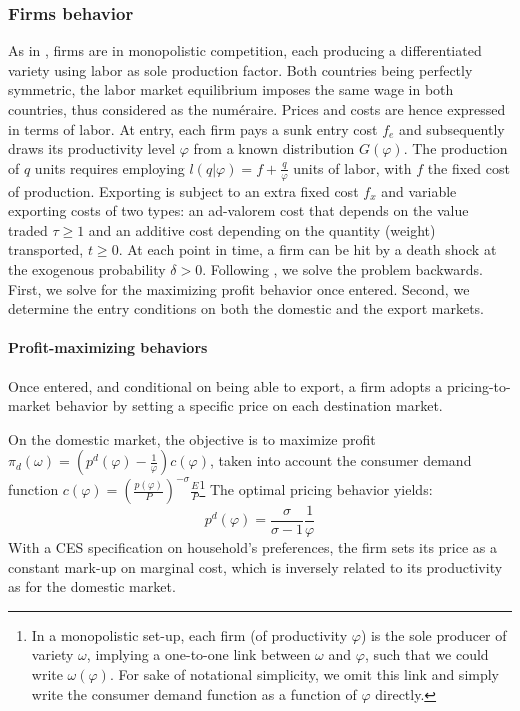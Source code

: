 \documentclass[a4paper,11pt]{article}
\begin{document}
\subsubsection{Firms behavior}

As in \cite{melitz}, firms are in monopolistic competition, each producing a differentiated variety using labor as sole production factor. Both countries being perfectly symmetric, the labor market equilibrium imposes the same wage in both countries, thus considered as the num\'{e}raire. Prices and costs are hence expressed in terms of labor. At entry, each firm pays a sunk entry cost $f_e$ and subsequently draws its productivity level $\varphi$ from a known distribution $G(\varphi)$. The production of $q$ units requires employing $l(q|\varphi) = f+\frac{q}{\varphi}$ units of labor, with $f$ the fixed cost of production. Exporting is subject to an extra fixed cost $f_x$ and variable exporting costs of two types: an ad-valorem cost that depends on the value traded $\tau\geq 1$ and an additive cost depending on the quantity (weight) transported, $t\geq 0$. At each point in time, a firm can be hit by a death shock at the exogenous probability $\delta>0$. Following \cite{melitz}, we solve the problem backwards. First, we solve for the maximizing profit behavior once entered. Second, we determine the entry conditions on both the domestic and the export markets.\medskip

\paragraph{Profit-maximizing behaviors} Once entered, and conditional on being able to export, a firm adopts a pricing-to-market behavior by setting a specific price on each destination market.

On the domestic market, the objective is to maximize profit $\pi_d(\omega)= \left(p^d(\varphi) -\frac{1}{\varphi}  \right)c(\varphi)$, taken into account the consumer demand function $c(\varphi) = \left(\frac{p(\varphi)}{P}  \right)^{-\sigma} \frac{E}{P}$\footnote{In a monopolistic set-up, each firm (of productivity $\varphi$) is the sole producer of variety $\omega$, implying a one-to-one link between $\omega$ and $\varphi$, such that we could write $\omega(\varphi)$. For sake of notational simplicity, we omit this link and simply write the consumer demand function as a function of $\varphi$ directly.}
The optimal pricing behavior yields:
$$p^d(\varphi) = \frac{\sigma}{\sigma-1}\frac{1}{\varphi}$$
With a CES specification on household's preferences, the firm sets its price as a constant mark-up on marginal cost, which is inversely related to its productivity as for the domestic market. \medskip
\end{document}
